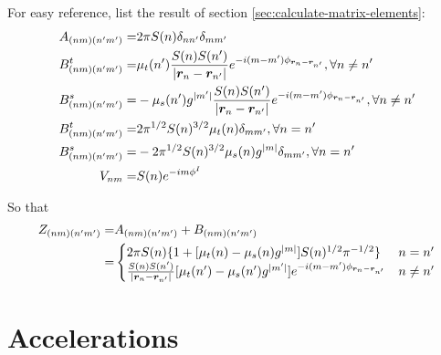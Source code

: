 \documentclass [10pt,letterpaper]{article}
\begin{document}
For easy reference, list the result of section \ref{sec:calculate-matrix-elements}:
\begin{align} \label{eq:list-of-Z-A-B}
	A_{(n m)(n^\prime m^\prime)}
	=&
	2\pi S(n)
	\delta_{n n^\prime}
	\delta_{m m^\prime}
	\\
	B^t_{(n m)(n^\prime m^\prime)}
	=& 
	\mu_t(n^\prime) 
	\frac{S(n) S(n^\prime)}{\lvert\vectorsym{r}_n-\vectorsym{r}_{n^\prime}\rvert}
	e^{-i (m-m^\prime) \phi_{\vectorsym{r}_n-\vectorsym{r}_{n^\prime}}}
	,
	\forall n\neq n^\prime
	\\
	B^s_{(n m)(n^\prime m^\prime)}
	=&
	-
	\mu_s(n^\prime)g^{\lvert m^\prime \rvert} 
	\frac{S(n) S(n^\prime)}{\lvert\vectorsym{r}_n-\vectorsym{r}_{n^\prime}\rvert}
	e^{-i (m-m^\prime) \phi_{\vectorsym{r}_n-\vectorsym{r}_{n^\prime}}}
	,
	\forall n\neq n^\prime
	\\
	B^t_{(n m)(n^\prime m^\prime)}
	=&
	2 
	\pi^{1/2}
	S(n)^{3/2}
	\mu_t(n) 
	\delta_{m m^\prime}
	,
	\forall n = n^\prime
	\\
	B^s_{(n m)(n^\prime m^\prime)}
	=&
	-2 
	\pi^{1/2}
	S(n)^{3/2}
	\mu_s(n)g^{\lvert m\rvert} 
	\delta_{m m^\prime}
	,
	\forall n = n^\prime
	\\
	V_{n m}
	=&
	S(n)e^{-i m \phi^I}
\end{align}

So that
\begin{equation} \label{eq:result-Znmnpmp-1pt}
	\begin{split}
		Z_{(n m)(n^\prime m^\prime)}
		=&
		A_{(n m)(n^\prime m^\prime)}
		+
		B_{(n m)(n^\prime m^\prime)}
		\\
		=& 
		\begin{cases}
			2\pi S(n) 
			\{
			1+[ \mu_t(n) -\mu_s(n) g^{\lvert m \rvert} ] 
			S(n)^{1/2}\pi^{-1/2}
			\}
			&
			n=n^\prime
			\\
			\frac{S(n)S(n^\prime)}{\lvert \vectorsym{r}_n-\vectorsym{r}_{n^\prime} \rvert}
			[ \mu_t(n^\prime)-\mu_s(n^\prime) g^{\lvert m^\prime \rvert} ]
			e^{-i(m-m^\prime)\phi_{\vectorsym{r}_n-\vectorsym{r}_{n^\prime}}}
			&
			n \neq n^\prime
		\end{cases}
	\end{split}
\end{equation}



\section{Accelerations}
\label{sec:acceleration}
	
\end{document}
